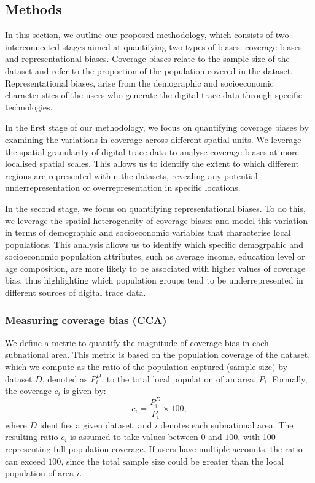 \documentclass[]{rsos}%
\begin{document}
\subsection{Methods}\label{methods}

In this section, we outline our proposed methodology, which consists of
two interconnected stages aimed at quantifying two types of biases:
coverage biases and representational biases. Coverage biases relate to
the sample size of the dataset and refer to the proportion of the
population covered in the dataset. Representational biases, arise from
the demographic and socioeconomic characteristics of the users who
generate the digital trace data through specific technologies.

In the first stage of our methodology, we focus on quantifying coverage
biases by examining the variations in coverage across different spatial
units. We leverage the spatial granularity of digital trace data to
analyse coverage biases at more localised spatial scales. This allows us
to identify the extent to which different regions are represented within
the datasets, revealing any potential underrepresentation or
overrepresentation in specific locations.

In the second stage, we focus on quantifying representational biases. To
do this, we leverage the spatial heterogeneity of coverage biases and
model this variation in terms of demographic and socioeconomic variables
that characterise local populations. This analysis allows us to identify
which specific demogrpahic and socioeconomic population attributes, such
as average income, education level or age composition, are more likely
to be associated with higher values of coverage bias, thus highlighting
which population groups tend to be underrepresented in different sources
of digital trace data.

\subsubsection{Measuring coverage bias (CCA)}\label{measuring-coverage-bias-cca}

We define a metric to quantify the magnitude of coverage bias in each
subnational area. This metric is based on the population coverage of the
dataset, which we compute as the ratio of the population captured
(sample size) by dataset \(D\), denoted as \(P_i^D\), to the total local
population of an area, \(P_i\). Formally, the coverage \(c_i\) is given by:
\begin{equation}
c_i = \dfrac{P_i^D}{P_i} \times 100,
\end{equation} where \(D\) identifies a given dataset, and \(i\) denotes
each subnational area. The resulting ratio \(c_i\) is assumed to take
values between \(0\) and \(100\), with 100 representing full population
coverage. If users have multiple accounts, the ratio can exceed \(100\),
since the total sample size could be greater than the local population
of area \(i\).
\end{document}
